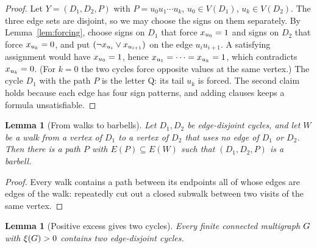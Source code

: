 \documentclass[11pt,a4paper]{article}
\newtheorem{lemma}[theorem]{Lemma}
\theoremstyle{definition}
\theoremstyle{remark}
\theoremstyle{plain}
\theoremstyle{definition}
\begin{document}
\begin{proof}
Let \(Y=(D_1,D_2,P)\) with \(P=u_0u_1\cdots u_k\), \(u_0\in V(D_1)\),
\(u_k\in V(D_2)\). The three edge sets are disjoint, so we may choose the signs
on them separately. By Lemma~\ref{lem:forcing}, choose signs on \(D_1\) that
force \(x_{u_0}=1\) and signs on \(D_2\) that force \(x_{u_k}=0\), and put
\((\neg x_{u_i}\vee x_{u_{i+1}})\) on the edge \(u_iu_{i+1}\). A satisfying
assignment would have \(x_{u_0}=1\), hence \(x_{u_1}=\dots=x_{u_k}=1\), which
contradicts \(x_{u_k}=0\). (For \(k=0\) the two cycles force opposite values at
the same vertex.) The cycle \(D_1\) with the path \(P\) is the letter Q: its
tail \(u_k\) is forced. The second claim holds because each edge has four sign
patterns, and adding clauses keeps a formula unsatisfiable.
\end{proof}

\begin{lemma}[From walks to barbells]\label{lem:walk}
Let \(D_1,D_2\) be edge-disjoint cycles, and let \(W\) be a walk from a vertex
of \(D_1\) to a vertex of \(D_2\) that uses no edge of \(D_1\) or \(D_2\). Then
there is a path \(P\) with \(E(P)\subseteq E(W)\) such that \((D_1,D_2,P)\) is
a barbell.
\end{lemma}

\begin{proof}
Every walk contains a path between its endpoints all of whose edges are edges
of the walk: repeatedly cut out a closed subwalk between two visits of the same
vertex.
\end{proof}

\begin{lemma}[Positive excess gives two cycles]\label{lem:excess-cycles}
Every finite connected multigraph \(G\) with \(\xi(G)>0\) contains two
edge-disjoint cycles.
\end{lemma}
\end{document}
